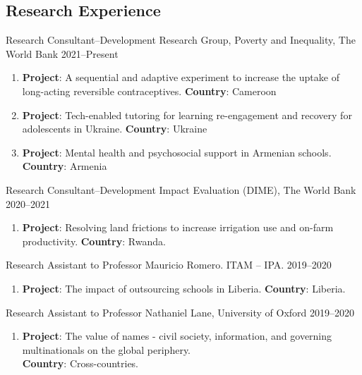 \documentclass[a4paper, 10pt]{article}
\renewenvironment{itemize}{
  \begin{list}{}
    { \setlength{\itemsep}{5pt}
      \setlength{\parsep}{0pt}
      \setlength{\topsep}{0pt}
      \setlength{\leftmargin}{0em} } }{
  \end{list}}
\begin{document}
\subsection*{Research Experience}

\begin{itemize}
  \item Research Consultant--Development Research Group, Poverty and Inequality, The World Bank \hfill 2021--Present 
  \begin{enumerate}[leftmargin=10pt, label={}, nosep]
    \item {\small \textbf{Project}: A sequential and adaptive experiment to increase the uptake of long-acting reversible contraceptives. \newline 
    \textbf{Country}: Cameroon} 
    \item {\small \textbf{Project}: Tech-enabled tutoring for learning re-engagement and recovery for adolescents in Ukraine. \newline 
    \textbf{Country}: Ukraine}
    \item {\small \textbf{Project}: Mental health and psychosocial support in Armenian schools. \newline 
    \textbf{Country}: Armenia}    
  \end{enumerate}
  \item Research Consultant--Development Impact Evaluation (DIME), The World Bank \hfill 2020--2021 
  \begin{enumerate}[leftmargin=10pt, label={}, nosep]  
    \item {\small \textbf{Project}: Resolving land frictions to increase irrigation use and on-farm productivity. \newline \textbf{Country}: Rwanda.}
  \end{enumerate}
  \item Research Assistant to Professor Mauricio Romero. ITAM -- IPA. \hfill 2019--2020  
  \begin{enumerate}[leftmargin=10pt, label={}, nosep]  
    \item {\small \textbf{Project}: The impact of outsourcing schools in Liberia. \newline \textbf{Country}: Liberia.}
  \end{enumerate}
  \item Research Assistant to Professor Nathaniel Lane, University of Oxford \hfill 2019--2020  
  \begin{enumerate}[leftmargin=10pt, label={}, nosep]  
    \item {\small \textbf{Project}: The value of names - civil society, information, and governing multinationals on the global periphery. \\ \textbf{Country}: Cross-countries.}

\end{enumerate}
\end{itemize}
\end{document}
